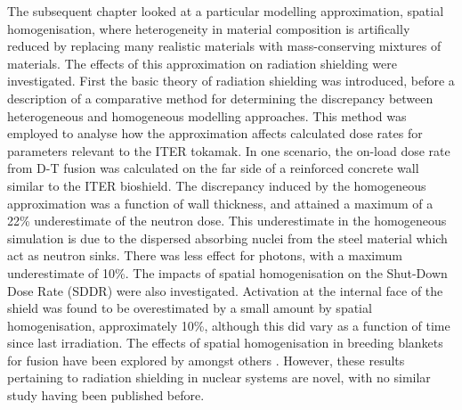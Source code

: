 The subsequent chapter looked at a particular modelling approximation, spatial homogenisation, where heterogeneity in material composition is artifically reduced by replacing many realistic materials with mass-conserving mixtures of materials. The effects of this approximation on radiation shielding were investigated. First the basic theory of radiation shielding was introduced, before a description of a comparative method for determining the discrepancy between heterogeneous and homogeneous modelling approaches. This method was employed to analyse how the approximation affects calculated dose rates for parameters relevant to the ITER tokamak. In one scenario, the on-load dose rate from D-T fusion was calculated on the far side of a reinforced concrete wall similar to the ITER bioshield. The discrepancy induced by the homogeneous approximation was a function of wall thickness, and attained a maximum of a 22\% underestimate of the neutron dose. This underestimate in the homogeneous simulation is due to the dispersed absorbing nuclei from the steel material which act as neutron sinks. There was less effect for photons, with a maximum underestimate of 10\%. The impacts of spatial homogenisation on the Shut-Down Dose Rate (SDDR) were also investigated. Activation at the internal face of the shield was found to be overestimated by a small amount by spatial homogenisation, approximately 10\%, although this did vary as a function of time since last irradiation. The effects of spatial homogenisation in breeding blankets for fusion have been explored by \citeauthor{Pelloni1989} amongst others \cite{Kumar1989}. However, these results pertaining to radiation shielding in nuclear systems are novel, with no similar study having been published before. 

